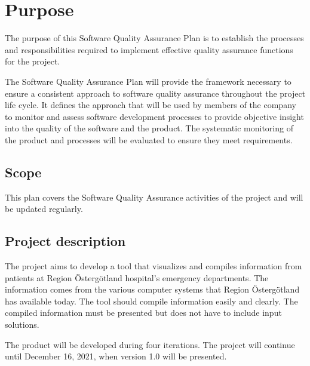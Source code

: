 \section{Purpose}
\label{sec:purpose}

The purpose of this Software Quality Assurance Plan is to establish the processes and responsibilities required to implement effective quality assurance functions for the project.

The Software Quality Assurance Plan will provide the framework necessary to ensure a consistent approach to software quality assurance throughout the project life cycle. It defines the approach that will be used by members of the company to monitor and assess software development processes to provide objective insight into the quality of the software and the product. The systematic monitoring of the product and processes will be evaluated to ensure they meet requirements. 

\subsection{Scope}
This plan covers the Software Quality Assurance activities of the project and will be updated regularly.

\subsection{Project description}
The project aims to develop a tool that visualizes and compiles information from patients at Region Östergötland hospital's emergency departments. The information comes from the various computer systems that Region Östergötland has available today. The tool should compile information easily and clearly. The compiled information must be presented but does not have to include input solutions.

The product will be developed during four iterations. The project will continue until December 16, 2021, when version 1.0 will be presented.


